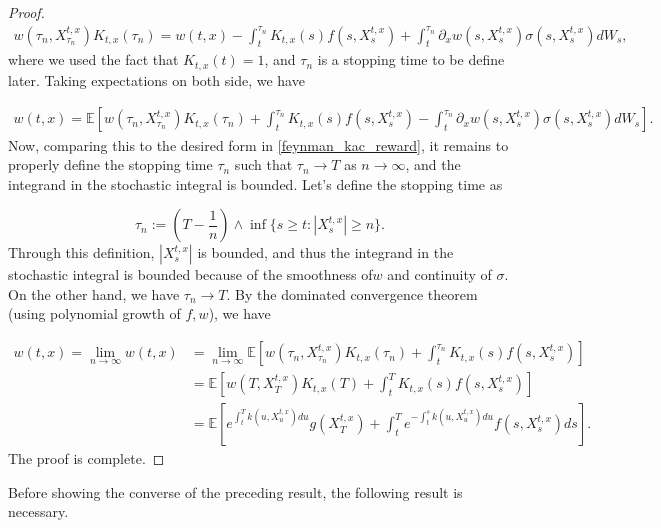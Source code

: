 \documentclass{article}
\begin{document}
\begin{proof}
\begin{equation*}
\begin{aligned}
w(\tau_n,X_{\tau_n}^{t,x})K_{t,x}(\tau_n)=w(t,x)-\int_t^{\tau_n}K_{t,x}(s)f(s,X_s^{t,x})+\int_t^{\tau_n}\partial_xw(s,X_s^{t,x})\sigma(s,X_s^{t,x})dW_s,
\end{aligned}
\end{equation*}
where we used the fact that $K_{t,x}(t)=1$, and $\tau_n$ is a stopping time to be define later. Taking expectations on both side, we have

\begin{equation*}
\begin{aligned}
w(t,x)=\mathbb{E}\left[w(\tau_n,X_{\tau_n}^{t,x})K_{t,x}(\tau_n)+\int_t^{\tau_n}K_{t,x}(s)f(s,X_s^{t,x})-\int_t^{\tau_n}\partial_xw(s,X_s^{t,x})\sigma(s,X_s^{t,x})dW_s\right].
\end{aligned}
\end{equation*}
Now, comparing this to the desired form in \eqref{feynman_kac_reward}, it remains to properly define the stopping time $\tau_n$ such that $\tau_n\rightarrow T$ as $n\rightarrow\infty$, and the integrand in the stochastic integral is bounded. Let's define the stopping time as

\begin{equation*}
\tau_n:=(T-\frac{1}{n})\wedge \inf \{s\geq t:|X_s^{t,x}|\geq n\}.
\end{equation*}
Through this definition, $|X_s^{t,x}|$ is bounded, and thus the integrand in the stochastic integral is bounded because of the smoothness of$w$ and continuity of $\sigma$. On the other hand, we have $\tau_n\rightarrow T$. By the dominated convergence theorem (using polynomial growth of $f,w$), we have

\begin{equation*}
\begin{aligned}
w(t,x)=\lim_{n\rightarrow\infty}w(t,x)&=\lim_{n\rightarrow\infty}\mathbb{E}\left[w(\tau_n,X_{\tau_n}^{t,x})K_{t,x}(\tau_n)+\int_t^{\tau_n}K_{t,x}(s)f(s,X_s^{t,x})\right]\\
&=\mathbb{E}\left[w(T,X_{T}^{t,x})K_{t,x}(T)+\int_t^{T}K_{t,x}(s)f(s,X_s^{t,x})\right]\\
&=\mathbb{E}\left[e^{\int_t^Tk(u,X_u^{t,x})du}g(X_T^{t,x})+\int^T_te^{-\int^s_tk(u,X_u^{t,x})du}f(s,X_s^{t,x})ds\right].
\end{aligned}
\end{equation*}
The proof is complete.
\end{proof}

Before showing the converse of the preceding result, the following result is necessary. 
\end{document}
